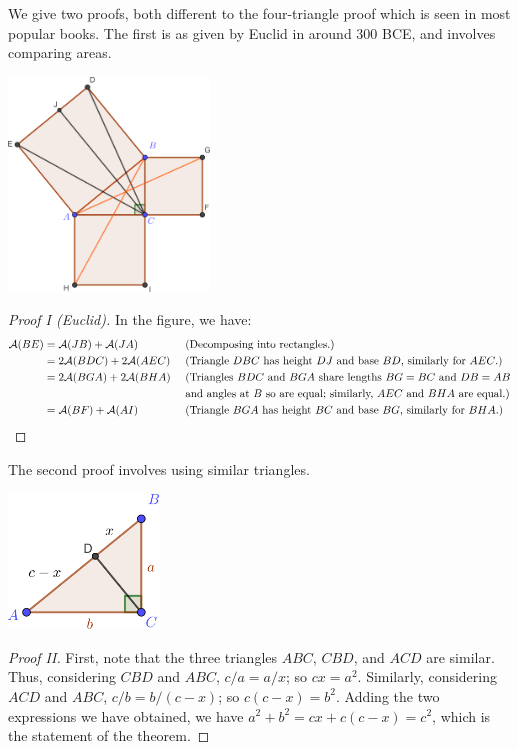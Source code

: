 \documentclass[a4paper,leqno]{article}
\numberwithin{equation}{section}
\theoremstyle{definition}
\theoremstyle{remark}
\begin{document}
We give two proofs, both different to the four-triangle proof which is seen in most popular books. The first is as given by Euclid in
around 300 BCE, and involves comparing areas.
\begin{center}
  \includegraphics[width=0.4\textwidth]{pythag2}
\end{center}
\begin{proof}[Proof I (Euclid)]
  In the figure, we have:
  \begin{align*}
    \mathcal{A}(BE) &= \mathcal{A}(JB) + \mathcal{A}(JA) && \text{ (Decomposing into rectangles.)}\\
                    &= 2\mathcal{A}(BDC) + 2\mathcal{A}(AEC) && \text{ (Triangle $ DBC $ has height $ DJ $ and base $BD $, similarly for $ AEC $.)}\\
                    &= 2\mathcal{A}(BGA) + 2\mathcal{A}(BHA) && \text{ (Triangles $ BDC $ and $ BGA $ share lengths $ BG = BC $ and $ DB = AB $}\\
                    &                                        && \text{ and angles at $ B $ so are equal; similarly, $ AEC $ and $ BHA $ are equal.)}\\
                    &= \mathcal{A}(BF) + \mathcal{A}(AI) && \text{ (Triangle $ BGA $ has height $ BC $ and base $ BG $, similarly for $ BHA $.)}
  \end{align*}
\end{proof}

The second proof involves using similar triangles.
\begin{center}
  \includegraphics[width=0.3\textwidth]{pythag3}
\end{center}
\begin{proof}[Proof II]
  First, note that the three triangles $ ABC $, $ CBD $, and $ ACD $ are similar. Thus, considering $ CBD $ and $ ABC $, $ c/a = a/x $; so $ cx = a^2 $.
  Similarly, considering $ ACD $ and $ ABC $, $ c/b = b/(c - x) $; so $ c(c - x) = b^2 $. Adding the two expressions we have obtained, we
  have $ a^2 + b^2 = cx + c(c - x) = c^2 $, which is the statement of the theorem.
\end{proof}
\end{document}
